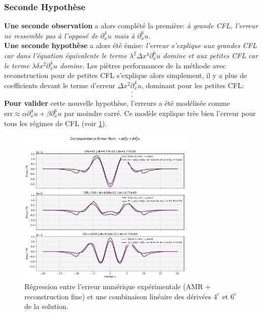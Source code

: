 \subsubsection{Seconde Hypothèse}
\textbf{Une seconde observation} a alors complété la première: \textit{à grande CFL, l'erreur ne ressemble pas à l'opposé de $\partial_x^4 u$ mais à 
$\partial_x^6 u$.}\\
\textbf{Une seconde hypothèse} a alors été émise: \textit{l'erreur s'explique aux grandes CFL car dans l'équation équivalente le terme $\lambda^2 \Delta x^4 \partial_x^6 u $ 
domine et aux petites CFL car le terme $\lambda \delta x^2 \partial_x^4 u$ domine.} Les piètres performances de la méthode avec reconstruction pour de petites CFL 
s'explique alors simplement, il y a plus de coefficients devant le terme d'erreur $\Delta x^2 \partial_x^4 u$, dominant pour les petites CFL:
\begin{align}
    .\\
    .
\end{align}
\textbf{Pour valider} cette nouvelle hypothèse, l'erreurs a été modélisée comme $\text{err} \approx \alpha \partial_x^4 u + \beta \partial_x^6u$ par moindre carré. 
Ce modèle explique très bien l'erreur pour tous les régimes de CFL (voir \ref{fig:derivees_vs_err}).
\begin{figure}[h!]
    \centering
    \includegraphics[width=0.75\textwidth]{media/4_travail/3/derivees_spatiales_VS_err_num.pdf}
    \caption{Régression entre l'erreur numérique expérimentale (AMR + reconstruction fine) et une combinaison linéaire des dérivées $4^e$ et $6^e$ de la solution.}
    \label{fig:derivees_vs_err}
\end{figure}\\
